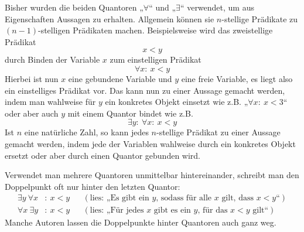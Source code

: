 \begin{bem}
 Bisher wurden die beiden Quantoren „$\forall$“ und „$\exists$“ verwendet, um aus Eigenschaften Aussagen zu erhalten. Allgemein können sie $n$-stellige Prädikate zu $(n-1)$-stelligen Prädikaten machen. Beispielsweise wird das zweistellige Prädikat
 \[ x < y \]
 durch Binden der Variable $x$ zum einstelligen Prädikat
 \[ \forall x:\ x<y \]
Hierbei ist nun $x$ eine gebundene Variable und $y$ eine freie Variable, es liegt also ein einstelliges Prädikat vor. Das kann nun zu einer Aussage gemacht werden, indem man wahlweise für $y$ ein konkretes Objekt einsetzt wie z.B. „$\forall x:\ x < 3$“ oder aber auch $y$ mit einem Quantor bindet wie z.B.
 \[ \exists y:\ \forall x:\ x < y \]
 Ist $n$ eine natürliche Zahl, so kann jedes $n$-stellige Prädikat zu einer Aussage gemacht werden, indem jede der Variablen wahlweise durch ein konkretes Objekt ersetzt oder aber durch einen Quantor gebunden wird.
 \end{bem}
 
 
 \begin{bem}
 Verwendet man mehrere Quantoren unmittelbar hintereinander, schreibt man den Doppelpunkt oft nur hinter den letzten Quantor:
 \begin{align*}
  \exists y\ \forall x& :\ x < y && (\text{lies: „Es gibt ein $y$, sodass für alle $x$ gilt, dass $x<y$“}) \\
  \forall x\ \exists y& :\ x < y && (\text{lies: „Für jedes $x$ gibt es ein $y$, für das $x<y$ gilt“})  
 \end{align*}
 Manche Autoren lassen die Doppelpunkte hinter Quantoren auch ganz weg.%
 \end{bem}

